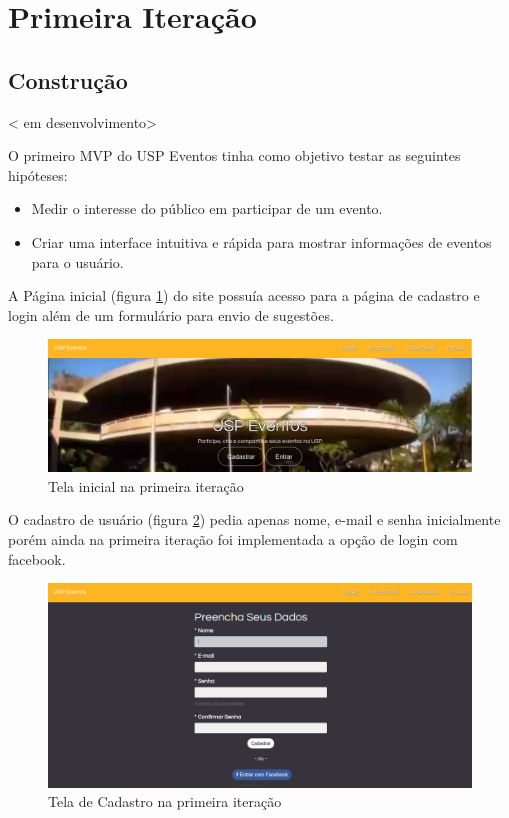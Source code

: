 \section{Primeira Iteração}
\subsection{Construção}
< em desenvolvimento>
         \par O primeiro MVP do USP Eventos tinha como objetivo testar as seguintes hipóteses:
         \begin{itemize}
         \item Medir o interesse do público em participar de um evento.
         \item Criar uma interface intuitiva e rápida para mostrar informações de eventos para o usuário.
         \end{itemize}
        \par A Página inicial (figura \ref{fig:landing_pagev1}) do site possuía acesso para a página de cadastro e login além de um formulário para envio de sugestões.
        \begin{figure}[htb]
		\includegraphics[width=15cm]{figuras/landing_pagev1}
		\caption{\label{fig:landing_pagev1} Tela inicial na primeira iteração }
		\end{figure}
        \par O cadastro de usuário (figura \ref{fig:sign_upv1}) pedia apenas nome, e-mail e senha inicialmente porém ainda na primeira iteração foi implementada a opção de login com facebook.
        \begin{figure}[htb]
		\includegraphics[width=15cm]{figuras/sign_upv1}
		\caption{\label{fig:sign_upv1} Tela de Cadastro na primeira iteração}
		\end{figure}
